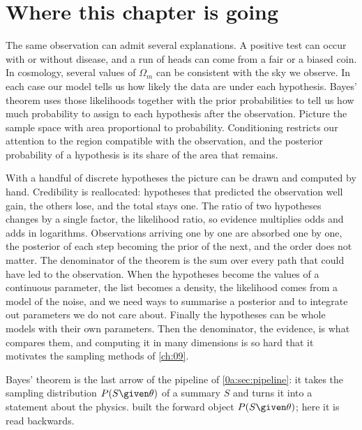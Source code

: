 \section*{Where this chapter is going}
\label{5a:sec:roadmap}

The same observation can admit several explanations. A positive test can
occur with or without disease, and a run of heads can come from a fair or a
biased coin. In cosmology, several values of $\Omega_m$ can be consistent
with the sky we observe. In each case our model tells us how likely the
data are under each hypothesis. Bayes' theorem uses those likelihoods
together with the prior probabilities to tell us how much probability to
assign to each hypothesis after the observation. Picture the sample space
with area proportional to probability. Conditioning restricts our attention
to the region compatible with the observation, and the posterior probability
of a hypothesis is its share of the area that remains.

With a handful of discrete hypotheses the picture can be drawn and computed by
hand. Credibility is reallocated: hypotheses that predicted the observation well
gain, the others lose, and the total stays one. The ratio of two hypotheses
changes by a single factor, the likelihood ratio, so evidence multiplies odds and
adds in logarithms. Observations arriving one by one are absorbed one by one, the
posterior of each step becoming the prior of the next, and the order does not
matter. The denominator of the theorem is the sum over every path that could have
led to the observation. When the hypotheses become the values of a continuous
parameter, the list becomes a density, the likelihood comes from a model of the
noise, and we need ways to summarise a posterior and to integrate out parameters
we do not care about. Finally the hypotheses can be whole models with their own
parameters. Then the denominator, the evidence, is what compares them, and
computing it in many dimensions is so hard that it motivates the sampling methods
of \cref{ch:09}.

Bayes' theorem is the last arrow of the pipeline of \cref{0a:sec:pipeline}: it
takes the sampling distribution $P(S\given\theta)$ of a summary $S$ and turns it
into a statement about the physics.  built the forward object $P(S\given\theta)$; here
it is read backwards.

